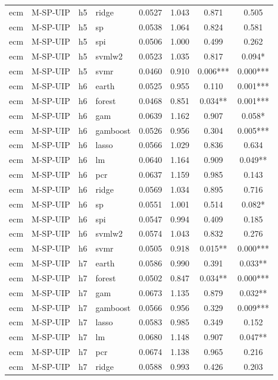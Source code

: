 \begin{ThreePartTable}
\begin{longtable}[t]{llclcccc}
ecm & M-SP-UIP & h5 & ridge & 0.0527 & 1.043 & 0.871 & 0.505\\
ecm & M-SP-UIP & h5 & sp & 0.0538 & 1.064 & 0.824 & 0.581\\
ecm & M-SP-UIP & h5 & spi & 0.0506 & 1.000 & 0.499 & 0.262\\
ecm & M-SP-UIP & h5 & svmlw2 & 0.0523 & 1.035 & 0.817 & 0.094*\\
ecm & M-SP-UIP & h5 & svmr & 0.0460 & 0.910 & 0.006*** & 0.000***\\
\addlinespace
ecm & M-SP-UIP & h6 & earth & 0.0525 & 0.955 & 0.110 & 0.001***\\
ecm & M-SP-UIP & h6 & forest & 0.0468 & 0.851 & 0.034** & 0.001***\\
ecm & M-SP-UIP & h6 & gam & 0.0639 & 1.162 & 0.907 & 0.058*\\
ecm & M-SP-UIP & h6 & gamboost & 0.0526 & 0.956 & 0.304 & 0.005***\\
ecm & M-SP-UIP & h6 & lasso & 0.0566 & 1.029 & 0.836 & 0.634\\
ecm & M-SP-UIP & h6 & lm & 0.0640 & 1.164 & 0.909 & 0.049**\\
ecm & M-SP-UIP & h6 & pcr & 0.0637 & 1.159 & 0.985 & 0.143\\
ecm & M-SP-UIP & h6 & ridge & 0.0569 & 1.034 & 0.895 & 0.716\\
ecm & M-SP-UIP & h6 & sp & 0.0551 & 1.001 & 0.514 & 0.082*\\
ecm & M-SP-UIP & h6 & spi & 0.0547 & 0.994 & 0.409 & 0.185\\
ecm & M-SP-UIP & h6 & svmlw2 & 0.0574 & 1.043 & 0.832 & 0.276\\
ecm & M-SP-UIP & h6 & svmr & 0.0505 & 0.918 & 0.015** & 0.000***\\
\addlinespace
ecm & M-SP-UIP & h7 & earth & 0.0586 & 0.990 & 0.391 & 0.033**\\
ecm & M-SP-UIP & h7 & forest & 0.0502 & 0.847 & 0.034** & 0.000***\\
ecm & M-SP-UIP & h7 & gam & 0.0673 & 1.135 & 0.879 & 0.032**\\
ecm & M-SP-UIP & h7 & gamboost & 0.0566 & 0.956 & 0.329 & 0.009***\\
ecm & M-SP-UIP & h7 & lasso & 0.0583 & 0.985 & 0.349 & 0.152\\
ecm & M-SP-UIP & h7 & lm & 0.0680 & 1.148 & 0.907 & 0.047**\\
ecm & M-SP-UIP & h7 & pcr & 0.0674 & 1.138 & 0.965 & 0.216\\
ecm & M-SP-UIP & h7 & ridge & 0.0588 & 0.993 & 0.426 & 0.203\\

\end{longtable}
\end{ThreePartTable}
